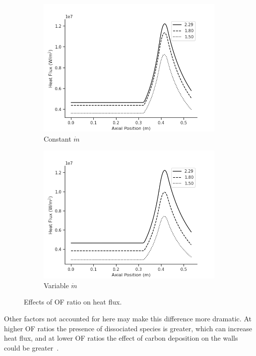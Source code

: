 \documentclass[11pt]{article}
\begin{document}
\begin{figure}[H]
  \centering
  \begin{subfigure}{.5\textwidth}
    \centering
    \includegraphics[width=\linewidth]{OF_Constant.png}
    \caption{Constant $\dot{m}$}
  \end{subfigure}%
  \begin{subfigure}{.5\textwidth}
    \centering
    \includegraphics[width=\linewidth]{OF_Variable.png}
    \caption{Variable $\dot{m}$}
  \end{subfigure}
  \caption{Effects of OF ratio on heat flux.}
  \label{fig:of_ratio}
\end{figure}

Other factors not accounted for here may make this difference more dramatic. At higher OF ratios the presence of dissociated species is greater, which can increase heat flux, and at lower OF ratios the effect of carbon deposition on the walls could be greater~\cite{cook_advanced_1980}.
\end{document}
